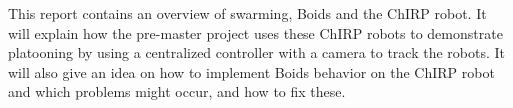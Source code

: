 This report contains an overview of swarming, Boids and the ChIRP robot. It will explain how the pre-master project uses these ChIRP robots to demonstrate platooning by using a centralized controller with a camera to track the robots. It will also give an idea on how to implement Boids behavior on the ChIRP robot and which problems might occur, and how to fix these.

